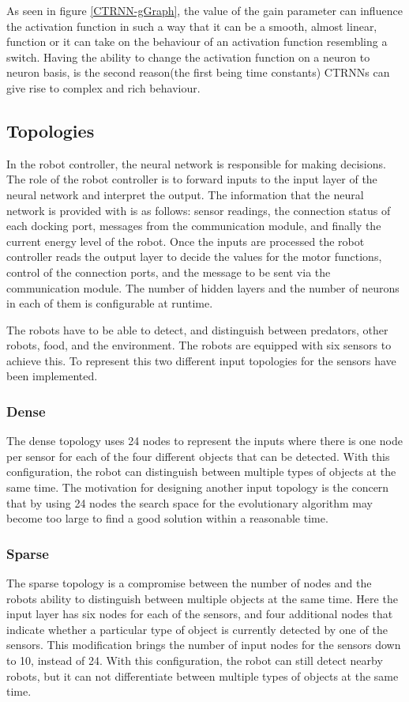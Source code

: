 As seen in figure \ref{CTRNN-gGraph}, the value of the gain parameter can influence the activation function in such a way that it can be a smooth, almost linear, function or it can take on the behaviour of an activation function resembling a switch.
Having the ability to change the activation function on a neuron to neuron basis, is the second reason(the first being time constants) CTRNNs can give rise to complex and rich behaviour.


\subsection{Topologies}
In the robot controller, the neural network is responsible for making decisions.
The role of the robot controller is to forward inputs to the input layer of the neural network and interpret the output.
The information that the neural network is provided with is as follows: sensor readings, the connection status of each docking port, messages from the communication module, and finally the current energy level of the robot.
Once the inputs are processed the robot controller reads the output layer to decide the values for the motor functions, control of the connection ports, and the message to be sent via the communication module.
The number of hidden layers and the number of neurons in each of them is configurable at runtime.

The robots have to be able to detect, and distinguish between predators, other robots, food, and the environment.
The robots are equipped with six sensors to achieve this.
To represent this two different input topologies for the sensors have been implemented.

\subsubsection{Dense}
The dense topology uses 24 nodes to represent the inputs where there is one node per sensor for each of the four different objects that can be detected.
With this configuration, the robot can distinguish between multiple types of objects at the same time.
The motivation for designing another input topology is the concern that by using 24 nodes the search space for the evolutionary algorithm may become too large to find a good solution within a reasonable time.

\subsubsection{Sparse}
The sparse topology is a compromise between the number of nodes and the robots ability to distinguish between multiple objects at the same time.
Here the input layer has six nodes for each of the sensors, and four additional nodes that indicate whether a particular type of object is currently detected by one of the sensors.
This modification brings the number of input nodes for the sensors down to 10, instead of 24.
With this configuration, the robot can still detect nearby robots, but it can not differentiate between multiple types of objects at the same time.

